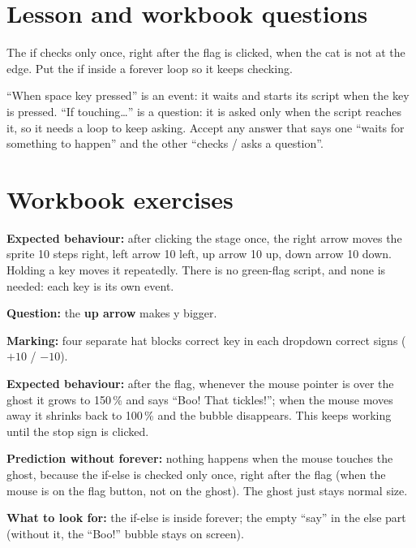
\section{Lesson and workbook questions}
\begin{answer}
The if checks only once, right after the flag is clicked, when the cat is not at the edge. Put the if inside a forever loop so it keeps checking.
\end{answer}

\begin{answer}
\enquote{When space key pressed} is an event: it waits and starts its script when the key is pressed. \enquote{If touching\ldots} is a question: it is asked only when the script reaches it, so it needs a loop to keep asking. Accept any answer that says one \enquote{waits for something to happen} and the other \enquote{checks / asks a question}.
\end{answer}

\section{Workbook exercises}
\begin{answer}
\textbf{Expected behaviour:} after clicking the stage once, the right arrow moves the sprite 10 steps right, left arrow 10 left, up arrow 10 up, down arrow 10 down. Holding a key moves it repeatedly. There is no green-flag script, and none is needed: each key is its own event.

\textbf{Question:} the \textbf{up arrow} makes y bigger.

\textbf{Marking:} \tickbox{} four separate hat blocks \quad \tickbox{} correct key in each dropdown \quad \tickbox{} correct signs ($+10$ / $-10$).
\end{answer}

\begin{answer}
\textbf{Expected behaviour:} after the flag, whenever the mouse pointer is over the ghost it grows to 150\,\% and says \enquote{Boo! That tickles!}; when the mouse moves away it shrinks back to 100\,\% and the bubble disappears. This keeps working until the stop sign is clicked.

\textbf{Prediction without forever:} nothing happens when the mouse touches the ghost, because the if-else is checked only once, right after the flag (when the mouse is on the flag button, not on the ghost). The ghost just stays normal size.

\textbf{What to look for:} the if-else is inside forever; the empty \enquote{say} in the else part (without it, the \enquote{Boo!} bubble stays on screen).
\end{answer}

